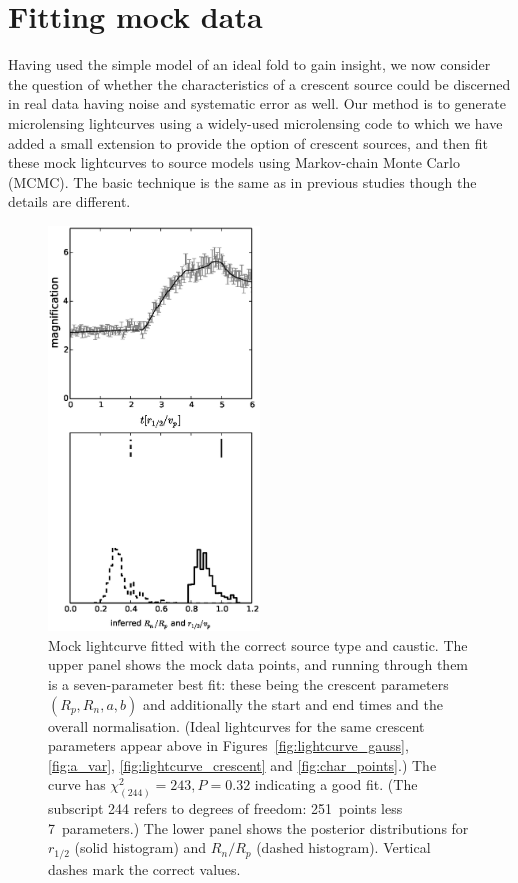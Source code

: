\documentclass[usenatbib]{mn2e}
\begin{document}
\section{Fitting mock data}\label{sec:numerics}

Having used the simple model of an ideal fold to gain insight, we now
consider the question of whether the characteristics of a crescent
source could be discerned in real data having noise and systematic
error as well.  Our method is to generate microlensing lightcurves
using a widely-used microlensing code
\citep{1990PhDT.......180W,1999A&A...346L...5W,1999JCoAM.109..353W} to
which we have added a small extension to provide the option of
crescent sources, and then fit these mock lightcurves to source models
using Markov-chain Monte Carlo (MCMC).  The basic technique is the same
as in previous studies \citep[e.g.,][]{2010ApJ...712..658P} though
the details are different.

\begin{figure}
\centering
  \includegraphics[width=0.5\textwidth]{figures/cc_forward.eps}
\caption{\label{fig:cc_forward} Mock lightcurve fitted with the
  correct source type and caustic.  The upper panel shows the mock
  data points, and running through them is a seven-parameter best fit:
  these being the crescent parameters $(R_p,R_n,a,b)$ and additionally
  the start and end times and the overall normalisation.  (Ideal
  lightcurves for the same crescent parameters appear above in
  Figures~\ref{fig:lightcurve_gauss}, \ref{fig:a_var},
  \ref{fig:lightcurve_crescent} and \ref{fig:char_points}.)  The curve
  has $\chi^2_{(244)}=243, P=0.32$ indicating a good fit.  (The
  subscript 244 refers to degrees of freedom: 251~points less
  7~parameters.)  The lower panel shows the posterior distributions
  for $r_{1/2}$ (solid histogram) and $R_n/R_p$ (dashed histogram).
  Vertical dashes mark the correct values.}
\end{figure}
\end{document}
